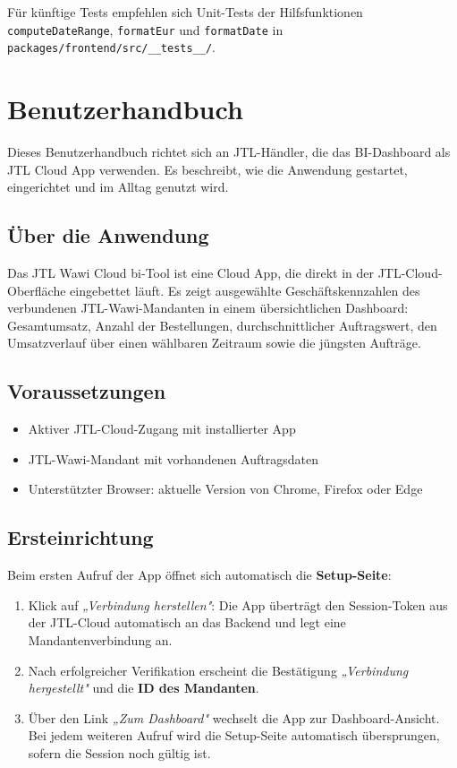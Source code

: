 \documentclass[11pt, a4paper, oneside]{report}
\begin{document}
Für künftige Tests empfehlen sich Unit-Tests der Hilfsfunktionen \texttt{computeDateRange},
\texttt{formatEur} und \texttt{formatDate} in
\texttt{packages/frontend/src/\_\_tests\_\_/}.

\section{Benutzerhandbuch}
\label{anhang:benutzerhandbuch}

Dieses Benutzerhandbuch richtet sich an JTL-Händler, die das BI-Dashboard als
JTL Cloud App verwenden. Es beschreibt, wie die Anwendung gestartet, eingerichtet
und im Alltag genutzt wird.

\subsection*{Über die Anwendung}

Das JTL Wawi Cloud \gls{bi}-Tool ist eine Cloud App, die direkt in der
JTL-Cloud-Oberfläche eingebettet läuft. Es zeigt ausgewählte Geschäftskennzahlen
des verbundenen JTL-Wawi-Mandanten in einem übersichtlichen Dashboard: Gesamtumsatz,
Anzahl der Bestellungen, durchschnittlicher Auftragswert, den Umsatzverlauf über einen
wählbaren Zeitraum sowie die jüngsten Aufträge.

\subsection*{Voraussetzungen}

\begin{itemize}[leftmargin=1.5em]
  \item Aktiver JTL-Cloud-Zugang mit installierter App
  \item JTL-Wawi-Mandant mit vorhandenen Auftragsdaten
  \item Unterstützter Browser: aktuelle Version von Chrome, Firefox oder Edge
\end{itemize}

\subsection*{Ersteinrichtung}

Beim ersten Aufruf der App öffnet sich automatisch die \textbf{Setup-Seite}:

\begin{enumerate}[leftmargin=1.5em]
  \item Klick auf \textit{„Verbindung herstellen"}: Die App überträgt den
        Session-Token aus der JTL-Cloud automatisch an das Backend und legt
        eine Mandantenverbindung an.
  \item Nach erfolgreicher Verifikation erscheint die Bestätigung
        \textit{„Verbindung hergestellt"} und die \textbf{ID des Mandanten}.
  \item Über den Link \textit{„Zum Dashboard"} wechselt die App zur
        Dashboard-Ansicht. Bei jedem weiteren Aufruf wird die Setup-Seite
        automatisch übersprungen, sofern die Session noch gültig ist.
\end{enumerate}
\end{document}
